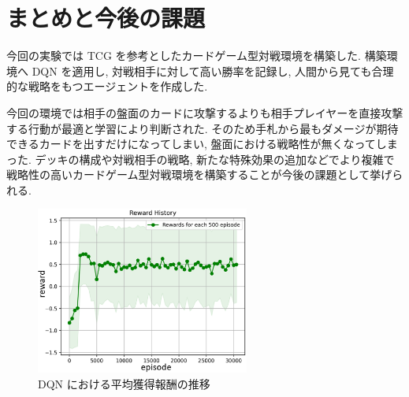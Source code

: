 \documentclass[twocolumn]{jarticle}
\begin{document}
\section{まとめと今後の課題}
今回の実験では TCG を参考としたカードゲーム型対戦環境を構築した. 構築環境へ DQN を適用し, 対戦相手に対して高い勝率を記録し, 人間から見ても合理的な戦略をもつエージェントを作成した.
\par
今回の環境では相手の盤面のカードに攻撃するよりも相手プレイヤーを直接攻撃する行動が最適と学習により判断された. そのため手札から最もダメージが期待できるカードを出すだけになってしまい, 盤面における戦略性が無くなってしまった. デッキの構成や対戦相手の戦略, 新たな特殊効果の追加などでより複雑で戦略性の高いカードゲーム型対戦環境を構築することが今後の課題として挙げられる.

\begin{figure}[t]
  \centering
  \small
  \includegraphics[width=70.0mm]{assets/graph.eps}
  \caption{DQN における平均獲得報酬の推移}
  \label{fig:DQNresult}
\end{figure}






\end{document}
